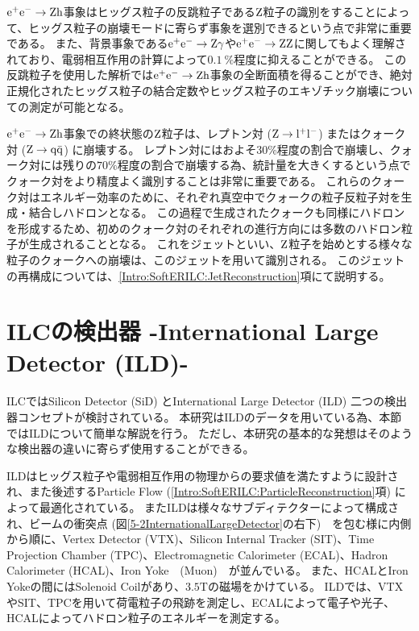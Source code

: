 $\rm e^+e^- \to Zh$事象はヒッグス粒子の反跳粒子である$\rm Z$粒子の識別をすることによって、ヒッグス粒子の崩壊モードに寄らず事象を選別できるという点で非常に重要である。
また、背景事象である$\rm e^+e^- \to Z\gamma$や$\rm e^+e^- \to ZZ$に関してもよく理解されており、電弱相互作用の計算によって$0.1\ \%$程度に抑えることができる\cite{GlobalProject}。
この反跳粒子を使用した解析では$\rm e^+e^- \to Zh$事象の全断面積を得ることができ、絶対正規化されたヒッグス粒子の結合定数やヒッグス粒子のエキゾチック崩壊についての測定が可能となる。

$\rm e^+e^- \to Zh$事象での終状態の$\rm Z$粒子は、レプトン対 ($\rm Z \to l^+l^-$) またはクォーク対 ($\rm Z \to q\bar{q}$) に崩壊する。
レプトン対にはおよそ$30\%$程度の割合で崩壊し、クォーク対には残りの$70\%$程度の割合で崩壊する為、統計量を大きくするという点でクォーク対をより精度よく識別することは非常に重要である。
これらのクォーク対はエネルギー効率のために、それぞれ真空中でクォークの粒子反粒子対を生成・結合しハドロンとなる。
この過程で生成されたクォークも同様にハドロンを形成するため、初めのクォーク対のそれぞれの進行方向には多数のハドロン粒子が生成されることとなる。
これをジェットといい、$\rm Z$粒子を始めとする様々な粒子のクォークへの崩壊は、このジェットを用いて識別される。
このジェットの再構成については、\ref{Intro:SoftERILC:JetReconstruction}項にて説明する。


\section{ILCの検出器 -International Large Detector (ILD)-} \label{Intro:InternationalLargeDetector}

ILCではSilicon Detector (SiD) とInternational Large Detector (ILD) 二つの検出器コンセプトが検討されている。
本研究はILDのデータを用いている為、本節ではILDについて簡単な解説を行う。
ただし、本研究の基本的な発想はそのような検出器の違いに寄らず使用することができる。

ILDはヒッグス粒子や電弱相互作用の物理からの要求値を満たすように設計され、また後述するParticle Flow (\ref{Intro:SoftERILC:ParticleReconstruction}項) によって最適化されている。
またILDは様々なサブディテクターによって構成され、ビームの衝突点 (図\ref{5-2InternationalLargeDetector}の右下)　を包む様に内側から順に、Vertex Detector (VTX)、Silicon Internal Tracker (SIT)、Time Projection Chamber (TPC)、Electromagnetic Calorimeter (ECAL)、Hadron Calorimeter (HCAL)、Iron Yoke　(Muon)　が並んでいる。
また、HCALとIron Yokeの間にはSolenoid Coilがあり、$3.5 \mathrm{T}$の磁場をかけている。
ILDでは、VTXやSIT、TPCを用いて荷電粒子の飛跡を測定し、ECALによって電子や光子、HCALによってハドロン粒子のエネルギーを測定する。

